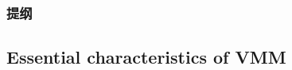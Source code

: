 \begin{frame}
\frametitle{提纲} %
\tableofcontents %
\end{frame}
\subsection{Essential characteristics of VMM}

